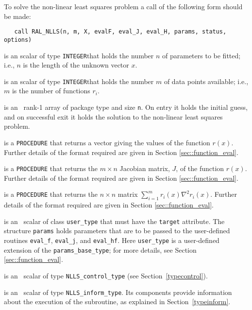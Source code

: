 \documentclass{hslspec}
\newcommand{\scalarintegerii}{is an \intentin scalar of type {\tt INTEGER}}
\begin{document}
To solve the non-linear least squares problem a call of the following form should be made:

\begin{verbatim}
   call RAL_NLLS(n, m, X, evalF, eval_J, eval_H, params, status, options)
\end{verbatim}

\begin{description}
 \scalarintegerii that holds the number $n$ of 
parameters to be fitted; i.e., $n$ is the length of the unknown vector $x$.

 \scalarintegerii that holds the number $m$ of 
data points available; i.e., $m$ is the number of functions $r_i$.

 is an \intentinout\  rank-1 array of package type 
and size {\tt n}.  On entry it holds the initial guess, and on 
successful exit it holds the solution to the non-linear least squares problem.

 is a {\tt PROCEDURE} that returns a vector giving the values of the function $r(x)$.  Further details of the format required are given in Section \ref{sec::function_eval}.

 is a {\tt PROCEDURE} that returns the $m \times n$ Jacobian matrix, $J$, of the function $r(x)$.  Further details of the format required are given in Section \ref{sec::function_eval}.

 is a {\tt PROCEDURE} that returns the $n \times n$ matrix $\sum_{i=1}^mr_i(x)\nabla^2 r_i(x)$.  Further details of the format required are given in Section \ref{sec::function_eval}.

 is an \inentin\ scalar of class {\tt user\_type} that must have the {\tt target} attribute.  The structure {\tt params} holds parameters that are to 
be passed to the user-defined routines {\tt eval\_f}, {\tt eval\_j}, and {\tt eval\_hf}.  
Here {\tt user\_type} is a user-defined extension of the {\tt params\_base\_type}; for more details, see Section \ref{sec::function_eval}.

is an \intentin\  scalar  of type {\tt NLLS\_control\_type}
(see Section~\ref{typecontrol}).

 is an \intentinout\ scalar of type 
{\tt NLLS\_inform\_type}. Its components provide information about the execution
of the subroutine, as explained in Section~\ref{typeinform}.

\end{description}
\end{document}
